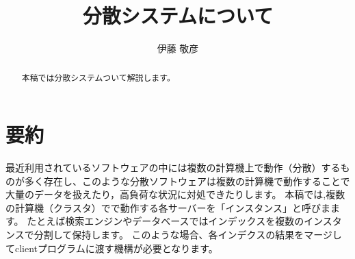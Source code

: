 \documentclass[a4paper, 10pt]{jarticle}
\title{分散システムについて}
\author{伊藤 敬彦}
\begin{document}
\maketitle
\begin{abstract}
本稿では分散システムついて解説します。
\end{abstract}

\section{要約}
最近利用されているソフトウェアの中には複数の計算機上で動作（分散）するものが多く存在し、このような分散ソフトウェアは複数の計算機で動作することで大量のデータを扱えたり，高負荷な状況に対処できたりします。
本稿では,複数の計算機（クラスタ）でで動作する各サーバーを「インスタンス」と呼びまます。
たとえば検索エンジンやデータベースではインデックスを複数のインスタンスで分割して保持します。
このような場合、各インデクスの結果をマージしてclientプログラムに渡す機構が必要となります。

\end{document}
